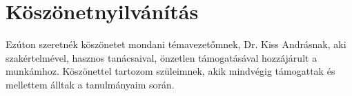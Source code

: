 \chapter*{Köszönetnyilvánítás}
\pagestyle{headings}
Ezúton szeretnék köszönetet mondani témavezetőmnek, Dr. Kiss Andrásnak, aki szakértelmével, hasznos tanácsaival, önzetlen támogatásával hozzájárult a munkámhoz.
Köszönettel tartozom szüleimnek, akik mindvégig támogattak és mellettem álltak a tanulmányaim során.

